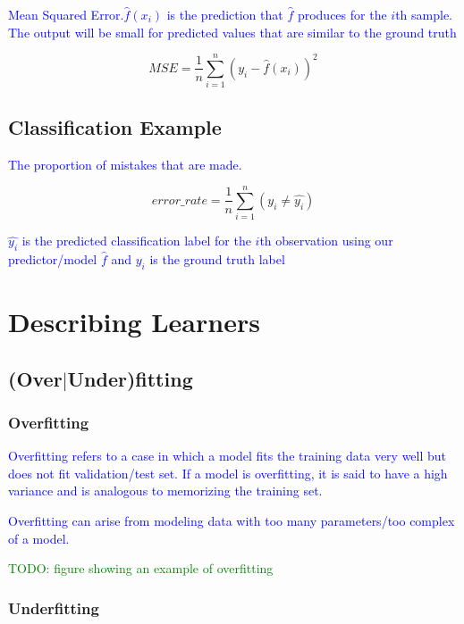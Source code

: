 \textcolor{blue}{Mean Squared Error.$\hat{f}(x_i)$ is the prediction that $\hat{f}$ produces for the $i$th sample. The output will be small for predicted values that are similar to the ground truth}

\begin{equation}
{MSE = \frac{1}{n}\sum_{i=1}^{n}(y_i - \hat{f}(x_i))^2}
\label{eq:MSE_def}
\end{equation}


\subsection{Classification Example}

\textcolor{blue}{The proportion of mistakes that are made.}

\begin{equation}
{error\_rate = \frac{1}{n}\sum_{i=1}^{n}(y_i \ne \hat{y_i})}
\label{eq:class_error_rate_def}
\end{equation}

\textcolor{blue}{$\hat{y_i}$ is the predicted classification label for the $i$th observation using our predictor/model $\hat{f}$ and $y_i$ is the ground truth label}

\section{Describing Learners}

\subsection{(Over$|$Under)fitting}

\subsubsection{Overfitting}

\textcolor{blue}{Overfitting refers to a case in which a model fits the training data very well but does not fit validation/test set. If a model is overfitting, it is said to have a high variance and is analogous to memorizing the training set.}

\textcolor{blue}{Overfitting can arise from modeling data with too many parameters/too complex of a model.}

\textcolor{green}{TODO: figure showing an example of overfitting}

\subsubsection{Underfitting}

